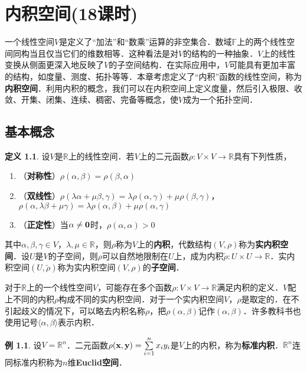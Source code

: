 \documentclass[a4paper,fontset=windows]{ctexbook}
\theoremstyle{definition}
\newtheorem{definition}{定义}[chapter]
\newtheorem{example}{例}[chapter]
\begin{document}
\chapter{内积空间(18课时)}%

一个线性空间$V$是定义了“加法”和“数乘”运算的非空集合．数域$\mathbb{F}$上的两个线性空间同构当且仅当它们的维数相等．这种看法是对$V$的结构的一种抽象．$V$上的线性变换从侧面更深入地反映了$V$的子空间结构．在实际应用中，$V$可能具有更加丰富的结构，如度量、测度、拓扑等等．本章考虑定义了“内积”函数的线性空间，称为{\bf 内积空间}．利用内积的概念，我们可以在内积空间上定义度量，然后引入极限、收敛、开集、闭集、连续、稠密、完备等概念，使$V$成为一个拓扑空间．

\section{基本概念}

\begin{definition}
设$V$是$\mathbb{R}$上的线性空间．若$V$上的二元函数$\rho:V\times V\to\mathbb{R}$具有下列性质，
\begin{enumerate}
\item（{\bf 对称性}）$\rho(\alpha,\beta)=\rho(\beta,\alpha)$

\item（{\bf 双线性}）$\rho(\lambda\alpha+\mu\beta,\gamma)=\lambda\rho(\alpha,\gamma)+\mu\rho(\beta,\gamma)$，$\rho(\alpha,\lambda\beta+\mu\gamma)=\lambda\rho(\alpha,\beta)+\mu\rho(\alpha,\gamma)$

\item（{\bf 正定性}）当$\alpha\ne{\bf 0}$时，$\rho(\alpha,\alpha)>0$
\end{enumerate}
其中$\alpha,\beta,\gamma\in V$，$\lambda,\mu\in\mathbb{R}$，则$\rho$称为$V$上的{\bf 内积}，代数结构$(V,\rho)$称为{\bf 实内积空间}．设$U$是$V$的子空间，则$\rho$可以自然地限制在$U$上，成为内积$\tilde{\rho}:U\times U\to\mathbb{R}$．实内积空间$(U,\tilde{\rho})$称为实内积空间$(V,\rho)$的{\bf 子空间}．
\end{definition}

对于$\mathbb{R}$上的一个线性空间$V$，可能存在多个函数$\rho:V\times V\to\mathbb{R}$满足内积的定义．$V$配上不同的内积$\rho$构成不同的实内积空间．对于一个实内积空间$V$，$\rho$是取定的．在不引起歧义的情况下，可以略去内积名称$\rho$，把$\rho(\alpha,\beta)$记作$(\alpha,\beta)$．许多教科书也使用记号$\langle\alpha,\beta\rangle$表示内积．

\begin{example}
设$V=\mathbb{R}^n$．二元函数$\rho({\bf x,y})=\sum\limits_{i=1}^nx_iy_i$是$V$上的内积，称为{\bf 标准内积}．$\mathbb{R}^n$连同标准内积称为$n$维{\bf Euclid空间}．
\end{example}
\end{document}
